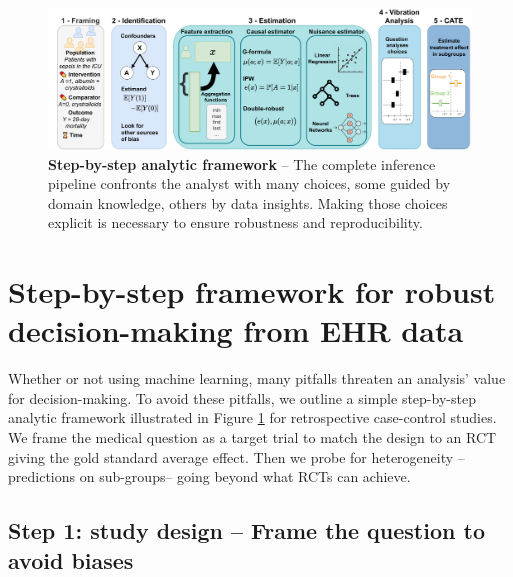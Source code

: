 \documentclass[10pt,letterpaper]{article}
\begin{document}
\begin{figure}[t!]
    \centering
    \includegraphics[width=0.9\linewidth]{img/complete_inference_flow.pdf}
    \caption{\textbf{Step-by-step analytic framework} -- The complete
        inference pipeline confronts the analyst with
        many choices, some guided by domain knowledge, others
        by data insights. Making those choices explicit is necessary to ensure
        robustness and reproducibility.}\label{fig:inference_framework}
\end{figure}


\section*{Step-by-step framework for robust decision-making from EHR data}\label{sec:inference_flow}

Whether or not using machine learning, many pitfalls threaten an analysis'
value for decision-making. To avoid these pitfalls, we outline a simple
step-by-step analytic framework illustrated in Figure
\ref{fig:inference_framework} for retrospective case-control studies. We frame
the medical question as a target trial \cite{hernan2021methods} to match the
design to an RCT giving the gold standard average effect. Then we probe for
heterogeneity --predictions on sub-groups--  going beyond what RCTs can
achieve.

\subsection*{Step 1: study design -- Frame the question to avoid biases}\label{sec:framing}
\end{document}
